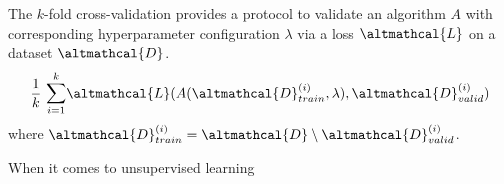 \documentclass[a4paper,12pt,times,numbered,print,index]{Classes/PhDThesisPSnPDF}
\begin{document}
\begin{example}
    The $k$-fold cross-validation provides a protocol to validate an algorithm $A$ with corresponding hyperparameter configuration $\lambda$ via a loss $\altmathcal{L}$ on a dataset $\altmathcal{D}$.
    \begin{equation*}
        \frac{1}{k}~\mathlarger{\sum}_{i=1}^{k} \altmathcal{L}(A(\altmathcal{D}_{train}^{(i)}, \lambda), \altmathcal{D}_{valid}^{(i)})
    \end{equation*}
    where $\altmathcal{D}_{train}^{(i)} = \altmathcal{D} \setminus \altmathcal{D}_{valid}^{(i)}$.
\end{example}

When it comes to unsupervised learning












\end{document}
